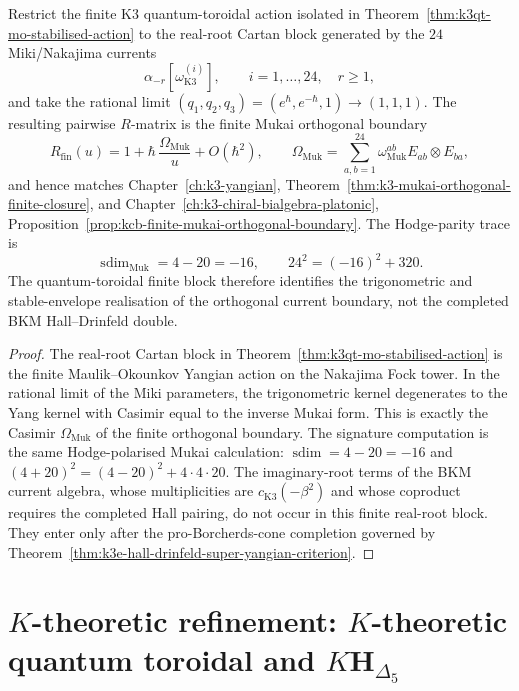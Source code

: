 \begin{proposition}
\label{prop:k3qt-finite-mukai-orthogonal-boundary}
Restrict the finite K3 quantum-toroidal action isolated in
Theorem~\ref{thm:k3qt-mo-stabilised-action} to the real-root Cartan
block generated by the $24$ Miki/Nakajima currents
\[
 \alpha_{-r}[\omega^{(i)}_{\mathrm K3}],
 \qquad i=1,\ldots,24,\quad r\geq1,
\]
and take the rational limit
$(q_1,q_2,q_3)=(e^{\hbar},e^{-\hbar},1)\to(1,1,1)$. The resulting
pairwise $R$-matrix is the finite Mukai orthogonal boundary
\[
 R_{\mathrm{fin}}(u)
 =
 1+\hbar\,\frac{\Omega_{\mathrm{Muk}}}{u}+O(\hbar^2),
 \qquad
 \Omega_{\mathrm{Muk}}
 =
 \sum_{a,b=1}^{24}
 \omega_{\mathrm{Muk}}^{ab}E_{ab}\otimes E_{ba},
\]
and hence matches
Chapter~\ref{ch:k3-yangian},
Theorem~\ref{thm:k3-mukai-orthogonal-finite-closure}, and
Chapter~\ref{ch:k3-chiral-bialgebra-platonic},
Proposition~\ref{prop:kcb-finite-mukai-orthogonal-boundary}. The
Hodge-parity trace is
\[
 \operatorname{sdim}_{\mathrm{Muk}}=4-20=-16,
 \qquad
 24^2=(-16)^2+320.
\]
The quantum-toroidal finite block therefore identifies the
trigonometric and stable-envelope realisation of the orthogonal current
boundary, not the completed BKM Hall--Drinfeld double.
\end{proposition}

\begin{proof}
The real-root Cartan block in
Theorem~\ref{thm:k3qt-mo-stabilised-action} is the finite
Maulik--Okounkov Yangian action on the Nakajima Fock tower. In the
rational limit of the Miki parameters, the trigonometric kernel
degenerates to the Yang kernel with Casimir equal to the inverse Mukai
form. This is exactly the Casimir
$\Omega_{\mathrm{Muk}}$ of the finite orthogonal boundary. The
signature computation is the same Hodge-polarised Mukai calculation:
$\operatorname{sdim}=4-20=-16$ and
$(4+20)^2=(4-20)^2+4\cdot4\cdot20$. The imaginary-root terms of the
BKM current algebra, whose multiplicities are
$c_{\mathrm K3}(-\beta^2)$ and whose coproduct requires the
completed Hall pairing, do not occur in this finite real-root block.
They enter only after the pro-Borcherds-cone completion governed by
Theorem~\ref{thm:k3e-hall-drinfeld-super-yangian-criterion}.
\end{proof}

\section{\texorpdfstring{$K$}{K}-theoretic refinement: \texorpdfstring{$K$}{K}-theoretic quantum toroidal and
\texorpdfstring{$K\mathbf{H}_{\Delta_5}$}{KH-Delta-5}}
\label{sec:k3qt-k-theoretic}

